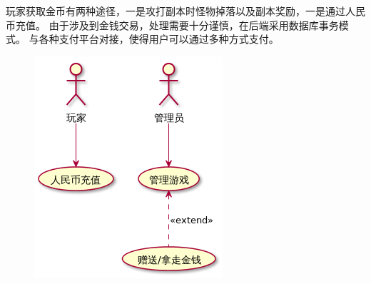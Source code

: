 \documentclass{article}
\begin{document}
\noindent{}玩家获取金币有两种途径，一是攻打副本时怪物掉落以及副本奖励，一是通过人民币充值。 由于涉及到金钱交易，处理需要十分谨慎，在后端采用数据库事务模式。 与各种支付平台对接，使得用户可以通过多种方式支付。%

\begin{figure}[tbp]%
\begin{mdcenter}%

\noindent{}\includegraphics[keepaspectratio=true]{./img/3}{}%

\mdhr{}%

\noindent{}%
\end{mdcenter}%
\end{figure}%
\end{document}
